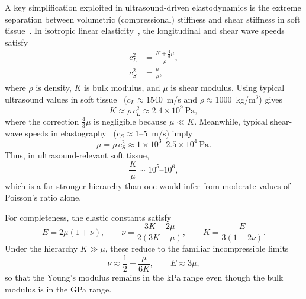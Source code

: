 \documentclass{iopjournal}
\begin{document}
A key simplification exploited in ultrasound-driven elastodynamics is the
extreme separation between volumetric (compressional) stiffness and shear
stiffness in soft
tissue~\cite{fung1993biomechanics,duck1990physical}. In isotropic linear
elasticity~\cite{auld1973acoustic,graff1991wave,achenbach1973wave}, the
longitudinal and shear wave speeds satisfy
\begin{align}
c_L^2 &= \frac{K+\frac{4}{3}\mu}{\rho},\\
c_S^2 &= \frac{\mu}{\rho},
\end{align}
where $\rho$ is density, $K$ is bulk modulus, and $\mu$ is shear modulus. Using
typical ultrasound values in soft
tissue~\cite{duck1990physical} ($c_L \approx 1540$~m/s and
$\rho \approx 1000$~kg/m$^3$) gives
\begin{equation}
K \approx \rho\,c_L^2 \approx 2.4\times 10^{9}\ \text{Pa},
\end{equation}
where the correction $\frac{4}{3}\mu$ is negligible because $\mu \ll K$.
Meanwhile, typical shear-wave speeds in
elastography~\cite{sandrin2003transient,barr2015elastography}
($c_S \approx 1$--$5$~m/s) imply
\begin{equation}
\mu = \rho\,c_S^2 \approx 1\times 10^{3}\text{--}2.5\times 10^{4}\ \text{Pa}.
\end{equation}
Thus, in ultrasound-relevant soft tissue,
\begin{equation}
\frac{K}{\mu} \sim 10^{5}\text{--}10^{6},
\end{equation}
which is a far stronger hierarchy than one would infer from moderate values of
Poisson's ratio alone.

For completeness, the elastic constants satisfy
\begin{equation}
E = 2\mu(1+\nu), \qquad
\nu = \frac{3K-2\mu}{2(3K+\mu)}, \qquad
K = \frac{E}{3(1-2\nu)}.
\end{equation}
Under the hierarchy $K \gg \mu$, these reduce to the familiar incompressible
limits
\begin{equation}
\nu \approx \frac{1}{2}-\frac{\mu}{6K}, \qquad
E \approx 3\mu,
\end{equation}
so that the Young's modulus remains in the kPa range even though the bulk
modulus is in the GPa range.
\end{document}
